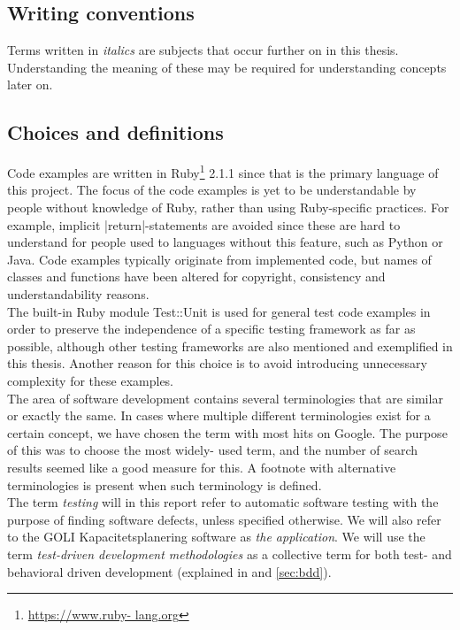 \MakeShortVerb{\|}

\subsection{Writing conventions}

Terms written in \emph{italics} are subjects that occur further on in
this thesis. Understanding the meaning of these may be required for
understanding concepts later on.\\


\subsection{Choices and definitions}

Code examples are written in Ruby\footnote{\url{https://www.ruby-
lang.org}} 2.1.1 since that is the primary language of this project. The
focus of the code examples is yet to be understandable by people without
knowledge of Ruby, rather than using Ruby-specific practices. For
example, implicit |return|-statements are avoided since these are
hard to understand for people used to languages without this feature,
such as Python or Java. Code examples typically originate from
implemented code, but names of classes and functions have been altered
for copyright, consistency and understandability reasons.\\

The built-in Ruby module Test::Unit is used for general test code
examples in order to preserve the independence of a specific testing
framework as far as possible, although other testing frameworks are also
mentioned and exemplified in this thesis. Another reason for this choice
is to avoid introducing unnecessary complexity for these examples.\\

The area of software development contains several terminologies that are
similar or exactly the same. In cases where multiple different
terminologies exist for a certain concept, we have chosen the term with
most hits on Google. The purpose of this was to choose the most widely-
used term, and the number of search results seemed like a good measure
for this. A footnote with alternative terminologies is present when
such terminology is defined.\\

The term \emph{testing} will in this report refer to automatic software
testing with the purpose of finding software defects, unless specified
otherwise. We will also refer to the GOLI Kapacitetsplanering software
as \emph{the application}. We will use the term \emph{test-driven
development methodologies} as a collective term for both test- and
behavioral driven development (explained in  and
\ref{sec:bdd}).\\
